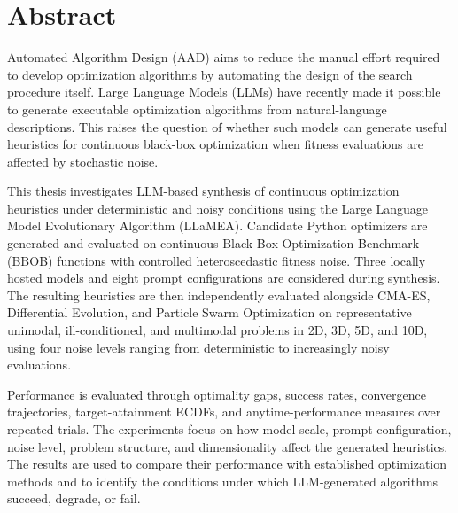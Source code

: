 
\chapter*{Abstract}

Automated Algorithm Design (AAD) aims to reduce the manual effort required to develop optimization algorithms by automating the design of the search procedure itself. Large Language Models (LLMs) have recently made it possible to generate executable optimization algorithms from natural-language descriptions. This raises the question of whether such models can generate useful heuristics for continuous black-box optimization when fitness evaluations are affected by stochastic noise.

This thesis investigates LLM-based synthesis of continuous optimization heuristics under deterministic and noisy conditions using the Large Language Model Evolutionary Algorithm (LLaMEA). Candidate Python optimizers are generated and evaluated on continuous Black-Box Optimization Benchmark (BBOB) functions with controlled heteroscedastic fitness noise. Three locally hosted models and eight prompt configurations are considered during synthesis. The resulting heuristics are then independently evaluated alongside CMA-ES, Differential Evolution, and Particle Swarm Optimization on representative unimodal, ill-conditioned, and multimodal problems in 2D, 3D, 5D, and 10D, using four noise levels ranging from deterministic to increasingly noisy evaluations.

Performance is evaluated through optimality gaps, success rates, convergence trajectories, target-attainment ECDFs, and anytime-performance measures over repeated trials. The experiments focus on how model scale, prompt configuration, noise level, problem structure, and dimensionality affect the generated heuristics. The results are used to compare their performance with established optimization methods and to identify the conditions under which LLM-generated algorithms succeed, degrade, or fail.
